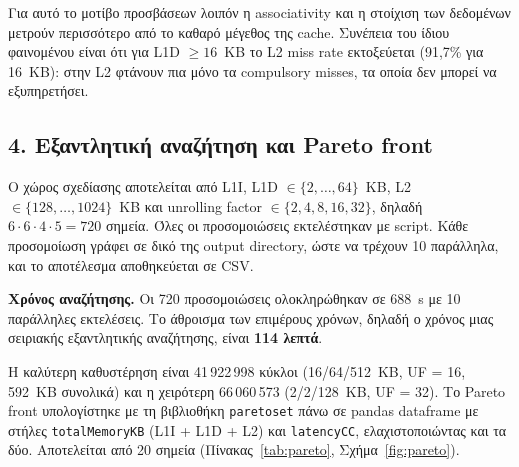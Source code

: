 \documentclass[11pt,a4paper]{article}
\begin{document}
Για αυτό το μοτίβο προσβάσεων λοιπόν η associativity και η στοίχιση των δεδομένων μετρούν
περισσότερο από το καθαρό μέγεθος της cache. Συνέπεια του ίδιου φαινομένου είναι ότι για
L1D $\ge 16$~KB το L2 miss rate εκτοξεύεται (91,7\% για 16~KB): στην L2 φτάνουν πια μόνο τα
compulsory misses, τα οποία δεν μπορεί να εξυπηρετήσει.

\subsection*{4. Εξαντλητική αναζήτηση και Pareto front}

Ο χώρος σχεδίασης αποτελείται από L1I, L1D $\in \{2,\dots,64\}$~KB, L2 $\in \{128,\dots,1024\}$~KB
και unrolling factor $\in \{2,4,8,16,32\}$, δηλαδή $6 \cdot 6 \cdot 4 \cdot 5 = 720$ σημεία.
Όλες οι προσομοιώσεις εκτελέστηκαν με script. Κάθε προσομοίωση γράφει σε δικό της output
directory, ώστε να τρέχουν 10 παράλληλα, και το αποτέλεσμα αποθηκεύεται σε CSV.

\textbf{Χρόνος αναζήτησης.} Οι 720 προσομοιώσεις ολοκληρώθηκαν σε 688~s με 10 παράλληλες
εκτελέσεις. Το άθροισμα των επιμέρους χρόνων, δηλαδή ο χρόνος μιας σειριακής εξαντλητικής
αναζήτησης, είναι \textbf{114 λεπτά}.

Η καλύτερη καθυστέρηση είναι 41\,922\,998 κύκλοι (16/64/512~KB, UF = 16, 592~KB συνολικά)
και η χειρότερη 66\,060\,573 (2/2/128~KB, UF = 32). Το Pareto front υπολογίστηκε με τη
βιβλιοθήκη \texttt{paretoset} πάνω σε pandas dataframe με στήλες \texttt{totalMemoryKB}
(L1I + L1D + L2) και \texttt{latencyCC}, ελαχιστοποιώντας και τα δύο. Αποτελείται από
20 σημεία (Πίνακας~\ref{tab:pareto}, Σχήμα~\ref{fig:pareto}).
\end{document}
